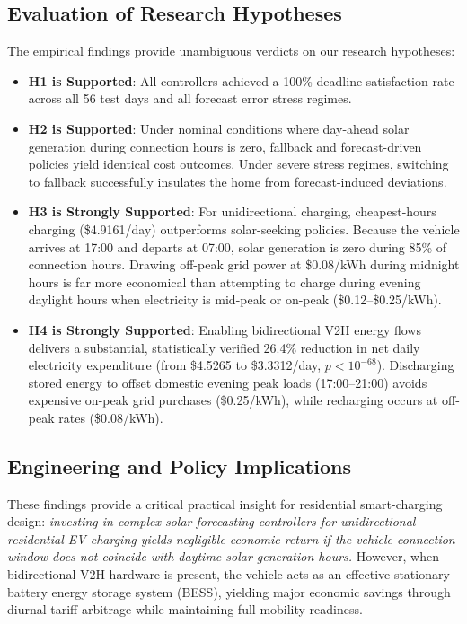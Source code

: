 \documentclass[conference]{IEEEtran}
\begin{document}
\subsection{Evaluation of Research Hypotheses}
The empirical findings provide unambiguous verdicts on our research hypotheses:
\begin{itemize}
    \item \textbf{H1 is Supported}: All controllers achieved a 100\% deadline satisfaction rate across all 56 test days and all forecast error stress regimes.
    \item \textbf{H2 is Supported}: Under nominal conditions where day-ahead solar generation during connection hours is zero, fallback and forecast-driven policies yield identical cost outcomes. Under severe stress regimes, switching to fallback successfully insulates the home from forecast-induced deviations.
    \item \textbf{H3 is Strongly Supported}: For unidirectional charging, cheapest-hours charging (\$4.9161/day) outperforms solar-seeking policies. Because the vehicle arrives at 17:00 and departs at 07:00, solar generation is zero during 85\% of connection hours. Drawing off-peak grid power at \$0.08/kWh during midnight hours is far more economical than attempting to charge during evening daylight hours when electricity is mid-peak or on-peak (\$0.12--\$0.25/kWh).
    \item \textbf{H4 is Strongly Supported}: Enabling bidirectional V2H energy flows delivers a substantial, statistically verified 26.4\% reduction in net daily electricity expenditure (from \$4.5265 to \$3.3312/day, $p < 10^{-68}$). Discharging stored energy to offset domestic evening peak loads (17:00--21:00) avoids expensive on-peak grid purchases (\$0.25/kWh), while recharging occurs at off-peak rates (\$0.08/kWh).
\end{itemize}

\subsection{Engineering and Policy Implications}
These findings provide a critical practical insight for residential smart-charging design: \textit{investing in complex solar forecasting controllers for unidirectional residential EV charging yields negligible economic return if the vehicle connection window does not coincide with daytime solar generation hours.} However, when bidirectional V2H hardware is present, the vehicle acts as an effective stationary battery energy storage system (BESS), yielding major economic savings through diurnal tariff arbitrage while maintaining full mobility readiness.
\end{document}
